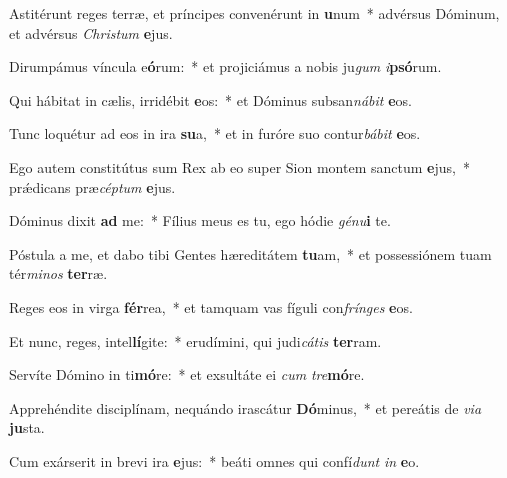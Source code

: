 \item Astitérunt reges terræ, et príncipes convenérunt in \textbf{u}num~* advérsus Dóminum, et advérsus \textit{Christum} \textbf{e}jus.
\item Dirumpámus víncula e\textbf{ó}rum:~* et projiciámus a nobis ju\textit{gum} \textit{i}\textbf{psó}rum. %
\item Qui hábitat in cælis, irridébit \textbf{e}os:~* et Dóminus subsan\textit{nábit} \textbf{e}os.
\item Tunc loquétur ad eos in ira \textbf{su}a,~* et in furóre suo contur\textit{bábit} \textbf{e}os.
\item Ego autem constitútus sum Rex ab eo super Sion montem san\-ctum \textbf{e}jus,~* prǽdicans præ\tinyhspace\textit{céptum} \textbf{e}jus.
\item Dóminus dixit \textbf{ad} me:~* Fílius meus es tu, ego hódie \textit{génu}\textbf{i} te.
\item Póstula a me, et dabo tibi Gentes hæreditátem \textbf{tu}am,~* et possessiónem tuam tér\textit{minos} \textbf{ter}ræ.
\item Reges eos in virga \textbf{fér}rea,~* et tamquam vas fíguli con\tinyhspace\textit{frínges} \textbf{e}os.
\item Et nunc, reges, intel\textbf{lí}gite:~* erudímini, qui judi\tinyhspace\textit{cátis} \textbf{ter}ram.
\item Servíte Dómino in ti\textbf{mó}re:~* et exsultáte ei \textit{cum} \textit{tre}\textbf{mó}re.
\item Apprehéndite disciplínam, nequándo irascátur \textbf{Dó}minus,~* et pereátis de \textit{via} \textbf{ju}sta.
\item Cum exárserit in brevi ira \textbf{e}jus:~* beáti omnes qui confí\tinyhspace\textit{dunt} \textit{in} \textbf{e}o.
